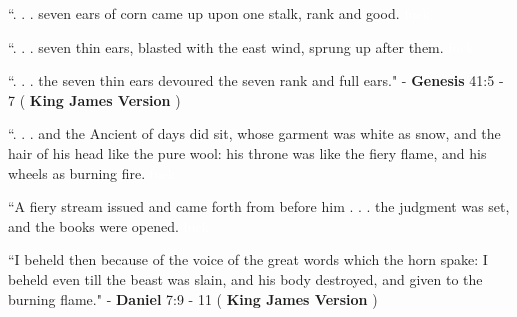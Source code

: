 \documentclass[11pt]{article}
\begin{document}
\vspace*{0.1\baselineskip}

\begingroup
\begin{center}
``. . . seven ears of corn came up upon one stalk, rank and good.
\rightskip\leftskip
\phantom{text} \hfill \textcolor{white}{fuck}
\end{center}
\endgroup

\begingroup
\begin{center}
``. . . seven thin ears, blasted with the east wind, sprung up after them.
\rightskip\leftskip
\phantom{text} \hfill \textcolor{white}{fuck}
\end{center}
\endgroup

\begingroup
\begin{center}
``. . . the seven thin ears devoured the seven rank and full ears."
\rightskip\leftskip
\phantom{text} \hfill - \textbf{Genesis} 41:5 - 7 ( \textbf{King James Version} )
\end{center}
\endgroup

\vspace*{0.1\baselineskip}

\begingroup
\begin{center}
``. . . and the Ancient of days did sit, whose garment was white as snow, and the hair of his head like the pure wool: his throne was like the fiery flame, and his wheels as burning fire.
\rightskip\leftskip
\phantom{text} \hfill \textcolor{white}{fuck}
\end{center}
\endgroup

\begingroup
\begin{center}
``A fiery stream issued and came forth from before him . . . the judgment was set, and the books were opened.
\rightskip\leftskip
\phantom{text} \hfill \textcolor{white}{fuck}
\end{center}
\endgroup

\begingroup
\begin{center}
``I beheld then because of the voice of the great words which the horn spake: I beheld even till the beast was slain, and his body destroyed, and given to the burning flame."
\rightskip\leftskip
\phantom{text} \hfill - \textbf{Daniel} 7:9 - 11 ( \textbf{King James Version} )
\end{center}
\endgroup

\pagebreak

\vspace*{12\baselineskip}
\end{document}
